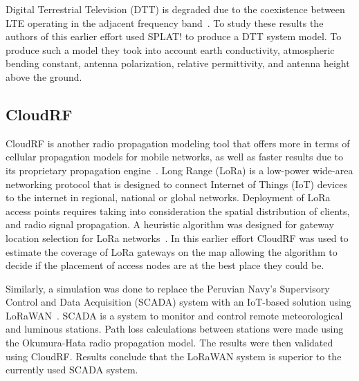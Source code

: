 Digital Terrestrial Television (DTT) is degraded due to the coexistence between LTE operating in the adjacent
frequency band~\cite{b13}. To study these results the authors of this earlier effort used SPLAT! to produce a DTT system model. To produce such a 
model they took into account earth conductivity, atmospheric bending constant, antenna polarization, relative permittivity, and 
antenna height above the ground.

\subsection{CloudRF}
CloudRF
is another radio propagation modeling tool that offers more in terms of cellular propagation models for mobile networks, 
as well as faster results due to its proprietary propagation engine~\cite{b11}. 
Long Range (LoRa) is a low-power wide-area networking protocol that is designed to connect Internet of Things (IoT) devices to the 
internet in regional, national or global networks. Deployment of LoRa access points requires taking into consideration the spatial 
distribution of clients, and radio signal propagation. A heuristic algorithm was designed for gateway location
selection for LoRa networks~\cite{b14}. In this earlier effort CloudRF was used to estimate the coverage of LoRa gateways on the map allowing the algorithm to
decide if the placement of access nodes are at the best place they could be. 

Similarly, a simulation was done to replace the Peruvian Navy's Supervisory Control and Data Acquisition (SCADA) 
system with an IoT-based solution using LoRaWAN~\cite{b15}. SCADA is a system to monitor and control remote meteorological and luminous 
stations. Path loss calculations between stations were made using the Okumura-Hata radio propagation model. The results were then 
validated using CloudRF. Results conclude that the LoRaWAN system is superior to the currently used SCADA system. 
